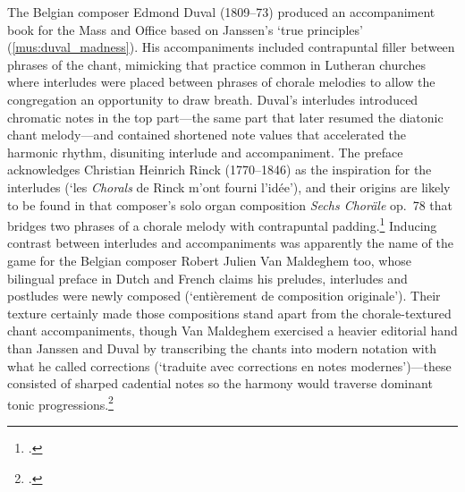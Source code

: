 The Belgian composer Edmond Duval (1809--73) produced an accompaniment book for the Mass and Office based on Janssen's `true principles' (\cref{mus:duval_madness}).
His accompaniments included contrapuntal filler between phrases of the chant, mimicking that practice common in Lutheran churches where interludes were placed between phrases of chorale melodies to allow the congregation an opportunity to draw breath.
Duval's interludes introduced chromatic notes in the top part---the same part that later resumed the diatonic chant melody---and contained shortened note values that accelerated the harmonic rhythm, disuniting interlude and accompaniment.
%
The preface acknowledges Christian Heinrich Rinck (1770--1846) as the inspiration for the interludes (`les \emph{Chorals} de Rinck m'ont fourni l'idée'), and their origins are likely to be found in that composer's solo organ composition \textit{Sechs Choräle} op.~78 that bridges two phrases of a chorale melody with contrapuntal padding.\footcite[unpaginated preface and p.~10]{Duvalorganistegregorienou1845}
Inducing contrast between interludes and accompaniments was apparently the name of the game for the Belgian composer Robert Julien Van Maldeghem too, whose bilingual preface in Dutch and French claims his preludes, interludes and postludes were newly composed (`entièrement de composition originale').
Their texture certainly made those compositions stand apart from the chorale-textured chant accompaniments, though Van Maldeghem exercised a heavier editorial hand than Janssen and Duval by transcribing the chants into modern notation with what he called corrections (`traduite avec corrections en notes modernes')---these consisted of sharped cadential notes so the harmony would traverse dominant \rightarrow{} tonic progressions.\footcite[1, 3]{VanMaldeghemMesseEngelenGregorianschen1841}

